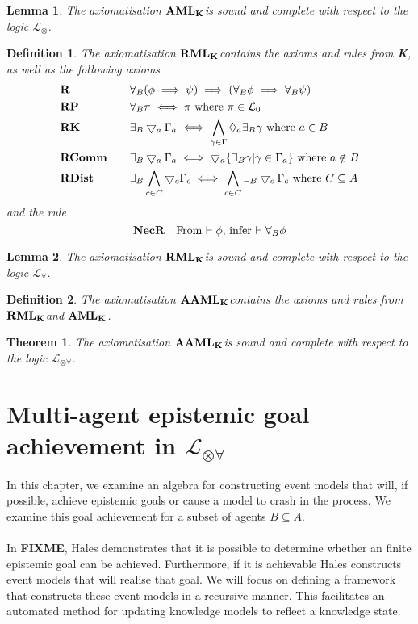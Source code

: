\documentclass[12pt, a4paper, titlepage]{article}
\newtheorem{defn}{Definition}[subsection]
\newtheorem{thm}{Theorem}[subsection]
\newtheorem{lemma}{Lemma}[subsection]
\numberwithin{equation}{section}
\newcommand{\cover}{\bigtriangledown}
\newcommand{\lang}{\mathcal{L}}
\newcommand{\langRefine}{\lang_{\forall}}
\newcommand{\langActEx}{\lang_{\otimes}}
\newcommand{\langArbAct}{\lang_{\otimes\forall}}
\newcommand{\langProp}{\lang_0}
\newcommand{\AXK}{{\bf K}}
\newcommand{\AXAML}{${\bf AML_{\AXK}}$}
\newcommand{\AXRML}{${\bf RML_{\AXK}}$}
\newcommand{\AXAAML}{${\bf AAML_{\AXK}}$}
\newcommand{\axR}{{\bf R}}
\newcommand{\axRP}{{\bf RP}}
\newcommand{\axRK}{{\bf RK}}
\newcommand{\axRComm}{{\bf RComm}}
\newcommand{\axRDist}{{\bf RDist}}
\newcommand{\axNecR}{{\bf NecR}}
\newcommand{\FIXME}{{\bf FIXME}}
\begin{document}
\begin{lemma} \label{axiomAMLSoundComplete}
The axiomatisation \AXAML is sound and complete with respect to the logic $\langActEx$.
\end{lemma}

\begin{defn} \label{axiomRML}
The axiomatisation \AXRML contains the axioms and rules from \AXK, as well as the following axioms
\begin{alignat*}{2}
	& \axR && \quad \forall_B (\phi \implies \psi) \implies (\forall_B \phi \implies \forall_B \psi) \\
	& \axRP && \quad \forall_B \pi \iff \pi \text{ where } \pi \in \langProp \\
	& \axRK && \quad\exists_B \cover_a \Gamma_a \iff \bigwedge_{\gamma \in \Gamma} \Diamond_a \exists_B
	\gamma \text{ where } a \in B \\
	& \axRComm && \quad \exists_B \cover_a \Gamma_a \iff \cover_a \{ \exists_B \gamma | \gamma \in
	\Gamma_a\} \text{ where } a \notin B\\
	& \axRDist && \quad \exists_B \bigwedge_{c \in C} \cover_c \Gamma_c \iff \bigwedge_{c \in C}
	\exists_B \cover_c \Gamma_c \text{ where } C \subseteq A
\end{alignat*}
and the rule
\[
	\axNecR \quad \text{From $\vdash \phi$, infer $\vdash \forall_B \phi$}
\]
\end{defn}

\begin{lemma} \label{axiomRMLSoundComplete}
The axiomatisation \AXRML is sound and complete with respect to the logic $\langRefine$.
\end{lemma}

\begin{defn} \label{axiomAAML}
The axiomatisation \AXAAML contains the axioms and rules from \AXRML and \AXAML.
\end{defn}

\begin{thm} \label{axiomAAMLSoundComplete}
The axiomatisation \AXAAML is sound and complete with respect to the logic $\langArbAct$.
\end{thm}

\section{Multi-agent epistemic goal achievement in $\langArbAct$}

In this chapter, we examine an algebra for constructing event models that will, if possible, achieve
epistemic goals or cause a model to crash in the process.
We examine this goal achievement for a subset of agents $B \subseteq A$.\\
\\
In \FIXME, Hales demonstrates that it is possible to determine whether an
finite epistemic goal can be achieved.
Furthermore, if it is achievable Hales constructs event models that will realise
that goal.
We will focus on defining a framework that constructs these event models in a
recursive manner.
This facilitates an automated method for updating knowledge models to reflect a
knowledge state.
\end{document}
